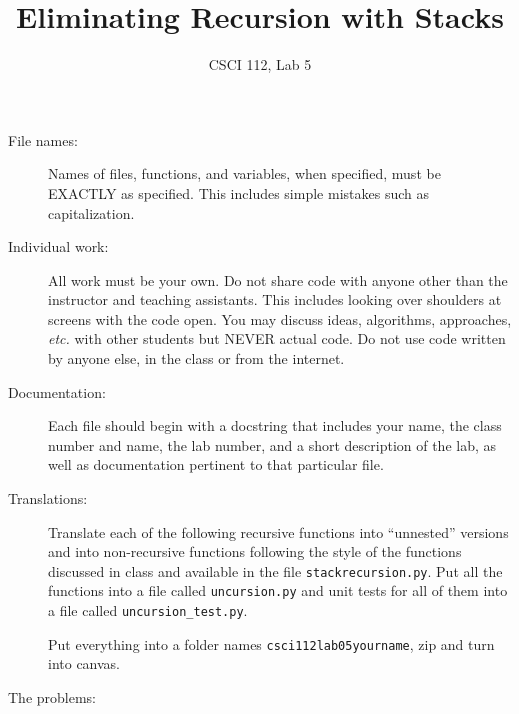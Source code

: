 \documentclass{article}
\title{Eliminating Recursion with Stacks}
\author{CSCI 112, Lab 5}
\date{}
\begin{document}
\sloppy

\maketitle

\begin{description} 
\item[File names:]  Names of files, functions, and variables, 
when specified,
must be EXACTLY as specified.  This includes simple mistakes such
as capitalization.

\item[Individual work:]  All work must be your own.  Do not share
code with anyone other than the instructor and teaching assistants.
This includes looking over shoulders at screens with the code open.
You may discuss ideas, algorithms, approaches, {\em etc.} with
other students but NEVER actual code.  Do not use code
written by anyone else, in the class or from the internet.

\item[Documentation:] Each file should begin with a docstring
that includes your name, the class number and name, the lab
number, and  
a short description of the lab, as well as documentation pertinent
to that particular file.

\item[Translations:]  Translate each of the following
recursive functions into ``unnested'' versions and into
non-recursive functions following
the style of the functions discussed in class and available in the
file \lstinline{stackrecursion.py}.  Put all the functions into
a file called \lstinline{uncursion.py} and unit tests
for all of them into a file called \lstinline{uncursion_test.py}.

Put everything into a folder names {\tt csci112lab05yourname}, zip
and turn into canvas.

\item[The problems:]
\end{description}
\end{document}
